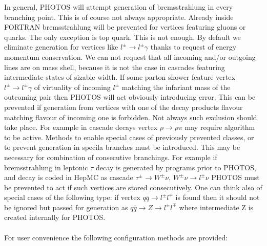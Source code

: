 \documentclass[]{Photos_interface_design}
\begin{document}
In general, PHOTOS will attempt generation of bremsstrahlung in every 
branching point. This is of course not always appropriate. Already inside FORTRAN bremsstrahlung will be prevented for vertices featuring gluons or quarks.
The only exception is top quark. This is not enough. By default we eliminate 
generation for vertices like $l^\pm \to l^\pm \gamma$ thanks to request of 
energy momentum conservation. We can not request that all incoming and/or 
outgoing 
lines are  on mass shell, because it is not the case in cascades featuring 
intermediate states of sizable width. If some parton shower feature
vertex  $l^\pm \to l^\pm \gamma$ of virtuality of incoming $l^\pm$ 
matching the infariant mass of the outcoming pair then PHOTOS will act
obviously introducing error. This can be prevented if generation from vertices
with one of the decay products flavour matching flavour of incoming 
one is forbidden. Not always such exclusion should take place. For example
in cascade decays vertex $\rho \to \rho \pi$ may require algorithm to be 
active. Methods to enable special cases of previously prevented classes, or to
prevent generation in specila branches must be introduced. This may be necessary for combination of consecutive branchings. For example if bremsstrahlung
in leptonic $\tau$ decay is generated by programs prior to PHOTOS, and decay is coded in HepMC as cascade $\tau^\pm \to W^\pm \nu$, $W^\pm \nu \to l^\pm \nu$
PHOTOS must be prevented to act if such vertices are stored consecutively.
One can think also of special cases of the following type:
if vertex $q \bar q \to l^\pm l^\mp$ is found then it should not be ignored
but passed for generation as $q \bar q \to Z \to l^\pm l^\mp$ where intermediate Z is created internally for PHOTOS. \\
\\
For user convenience the following configuration methods are provided:
\end{document}
